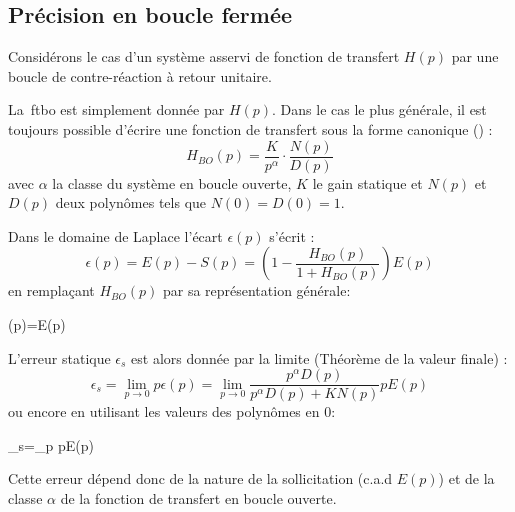 \subsection{Précision en boucle fermée}

Considérons le cas d'un système asservi de fonction de transfert $H(p)$
par une boucle de contre-réaction à retour unitaire.

\begin{center}
\end{center}

La~\gls{ftbo} est simplement donnée par $H(p)$. Dans le cas le plus
générale, il est toujours possible d'écrire une fonction de transfert
sous la forme canonique () :
$$
H_{BO}(p)=\dfrac{K}{p^\alpha}\cdot\dfrac{N(p)}{D(p)}
$$
avec $\alpha$ la classe du système en boucle ouverte, $K$ le gain statique et 
$N(p)$ et $D(p)$ deux polynômes tels que $N(0)=D(0)=1$. 


Dans le domaine de Laplace l'écart $\epsilon(p)$ s'écrit :
$$
\epsilon(p)=E(p)-S(p)=\left(1-\dfrac{H_{BO}(p)}{1+H_{BO}(p)}\right)E(p)
$$
en remplaçant $H_{BO}(p)$ par sa représentation générale:
\begin{bequation}
\epsilon(p)=E(p)
\end{bequation}

L'erreur statique $\epsilon_s$ est alors donnée par la limite (Théorème 
de la valeur finale) :
$$
\epsilon_s=\lim\limits_{p\to 0} p\epsilon(p)=\lim\limits_{p\to 0} \dfrac{p^\alpha D(p)}{p^\alpha D(p)+KN(p)}pE(p) 
$$
ou encore en utilisant les valeurs des polynômes en 0: 
\begin{bequation}
	\epsilon_s=\lim\limits_{p} pE(p)
	\label{eq-erreurStatique}
\end{bequation}

Cette erreur dépend donc de la nature de la sollicitation (c.a.d $E(p)$) et 
de la classe $\alpha$ de la fonction de transfert en boucle ouverte.

